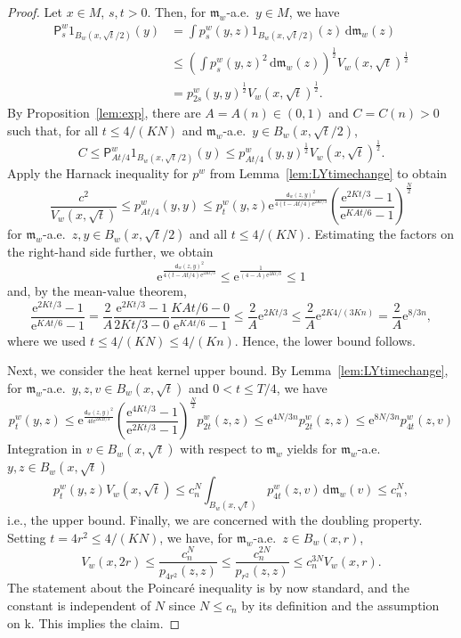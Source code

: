 \documentclass[10pt]{article}
\newcommand{\m}{\mathfrak{m}}
\newcommand{\M}{{\mathit{M}}}
\renewcommand{\d}{\,\mathrm{d}}
\newcommand{\e}{\mathrm{e}}
\renewcommand{\k}{\mathrm{k}}
\renewcommand{\P}{\mathsf{P}}
\newcommand{\One}{1}
\newcommand{\dist}{\mathsf{d}}
\theoremstyle{plain}
\theoremstyle{definition}
\begin{document}
\begin{proof}
    Let $x\in\M$, $s,t>0$. Then, for $\m_w$-a.e.~$y\in M$, we have
    \begin{align*}
    \P_{s}^w\One_{B_w(x,\sqrt t/2)}(y)& =\int p_{s}^w(y,z)\One_{B_w(x,\sqrt t/2)}(z)\d \m_w(z)
    \\
    & \leq 
    \left(\int p_{s}^w(y,z)^2\d \m_w(z)\right)^{\frac{1}{2}}V_w(x,\sqrt{t})^\frac{1}{2}\\
    & =p_{2s}^w(y,y)^\frac{1}{2}V_w(x,\sqrt{t})^\frac{1}{2}.
    \end{align*}
    By Proposition~\ref{lem:exp}, there are $A=A(n)\in(0,1)$ and $C=C(n)>0$ such that, for all $t\leq 4/(KN)$ and $\m_w$-a.e.~$y\in B_w(x,\sqrt t/2)$,
    \[
    C\leq \P^w_{At/4}\One_{B_w(x,\sqrt t/2)}(y)\leq p^w_{At/4}(y,y)^\frac{1}{2}V_w(x,\sqrt{t})^\frac{1}{2}.
    \]
    Apply the Harnack inequality for $p^w$ from Lemma~\ref{lem:LYtimechange} to obtain
    \[
    \frac{c^2}{V_w(x,\sqrt{t})}\le p^w_{At/4}(y,y)
    \leq p_t^w(y,z)
    \e^{\frac{\dist_w(z,y)^2}{4(t-At/4)\e^{2Kt/3}}}\left(\frac{\e^{2Kt/3}-1}{\e^{KAt/6}-1}\right)^{\frac{N}{2}}
    \]
    for $\m_w$-a.e.~$z,y\in B_w(x,\sqrt t/2)$ and all $t\leq 4/(KN)$. Estimating the factors on the right-hand side further, we obtain
    \[
    \e^{\frac{\dist_w(z,y)^2}{4(t-At/4)\e^{2Kt/3}}}\leq \e^{\frac{1}{(4-A)\e^{2Kt/3}}}\leq 1
    \]
    and, by the mean-value theorem,
    \[
    \frac{\e^{2Kt/3}-1}{\e^{KAt/6}-1}
    =\frac{2}{A}\frac{\e^{2Kt/3}-1}{2Kt/3-0}\frac{KAt/6-0}{\e^{KAt/6}-1}
    \leq 
    \frac{2}{A}\e^{2Kt/3}\leq \frac{2}{A}\e^{2K4/(3Kn)}=\frac{2}{A}\e^{8/3n},
    \]
    where we used $t\leq 4/(KN)\leq 4/(Kn)$. Hence, the lower bound follows.

    Next, we consider the heat kernel upper bound. By Lemma~\ref{lem:LYtimechange}, for $\m_w$-a.e.~$y,z,v\in B_w(x,\sqrt t)$ and $0<t\le T/4$, we have 
\[
p_t^w(y,z)\leq \e^{\frac{\dist_w(z,y)^2}{4t\e^{2K{2t}/3}}}\left(\frac{\e^{4Kt/3}-1}{\e^{2Kt/3}-1}\right)^{\frac{N}{2}}p_{2t}^w(z,z)\leq \e^{4N/3n}p_{2t}^w(z,z)\leq \e^{8N/3n}p_{4t}^w(z,v)
\]
    Integration in $v \in B_w(x,\sqrt t)$ with respect to $\m_w$ yields for $\m_w$-a.e.~$y,z\in B_w(x,\sqrt t)$
    \[p_t^w(y,z)V_w(x,\sqrt{t})\leq c_n^{N}\int_{B_w(x,\sqrt t)}p^w_{4t}(z,v)\d\m_w(v)\leq c_n^{N},
    \]
    i.e., the upper bound. Finally, we are concerned with the doubling property. Setting $t=4r^2\leq 4/(KN)$, we have, for $\m_w$-a.e.~$z\in B_w(x,r)$,
    \[
    V_w(x,2r)\leq \frac{c_n^{N}}{p_{4r^2}(z,z)}\leq \frac{c_n^{2N}}{p_{r^2}(z,z)}\le c_n^{3N}V_w(x,r).
    \]
    The statement about the Poincar\'e inequality is by now standard, and the constant is independent of $N$ since $N\le c_n$ by its definition and the assumption on $\k$. This implies the claim.
\end{proof}
\end{document}
